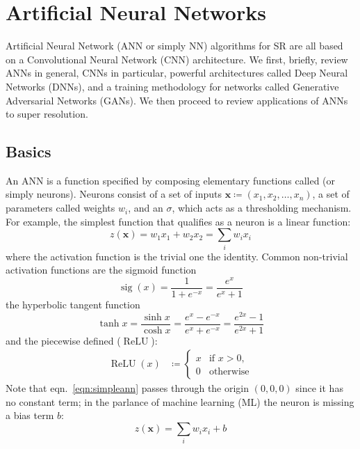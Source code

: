\section{Artificial Neural Networks}\label{sec:neural-networks}

\localtableofcontents

Artificial Neural Network (ANN or simply NN) algorithms for SR are all based on a Convolutional Neural Network (CNN) architecture.
%
We first, briefly, review ANNs in general, CNNs in particular, powerful architectures called Deep Neural Networks (DNNs), and a training methodology for networks called Generative Adversarial Networks (GANs).
%
We then proceed to review applications of ANNs to super resolution.
%
\subsection{Basics}

An ANN is a function specified by composing elementary functions called  (or simply neurons).
%
Neurons consist of a set of inputs \(\mathbf{x} \coloneqq (x_1, x_2, \dots, x_n)\), a set of parameters called weights \(w_i\), and an  \(\sigma\), which acts as a thresholding mechanism.
%
For example, the simplest function that qualifies as a neuron is a linear function:
\begin{equation}
    z(\mathbf{x}) = w_1 x_1 + w_2 x_2 = \sum_i w_i x_i
    \label{eqn:simpleann}
\end{equation}
where the activation function is the trivial one the identity.
%
Common non-trivial activation functions are the sigmoid function
\begin{equation}
    \operatorname{sig}(x)={\frac {1}{1+e^{-x}}}={\frac {e^{x}}{e^{x}+1}}
\end{equation}
the hyperbolic tangent function
\begin{equation}
    \tanh x={\frac {\sinh x}{\cosh x}}={\frac {e^{x}-e^{-x}}{e^{x}+e^{-x}}}={\frac {e^{2x}-1}{e^{2x}+1}}
\end{equation}
and the piecewise defined  (\(\operatorname{ReLU}\)):
\begin{align}
    \operatorname{ReLU}(x) & \coloneqq \begin{cases}x&{\text{if }}x>0,\\0&{\text{otherwise}}\end{cases} 
\end{align}
Note that eqn.~\eqref{eqn:simpleann} passes through the origin \((0,0,0)\) since it has no constant term; in the parlance of machine learning (ML) the neuron is missing a bias term \(b\):
\begin{equation}
    z(\mathbf{x}) = \sum_i w_i x_i + b
    \label{eqn:linearregr}
\end{equation}


